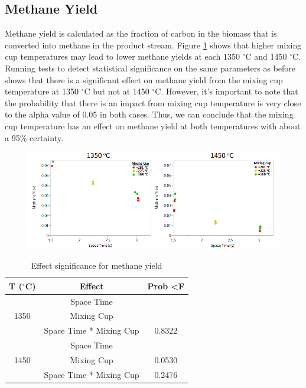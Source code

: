 \documentclass[11pt,twocolumn]{article}
\begin{document}
\subsection*{Methane Yield}

Methane yield is calculated as the fraction of carbon in the biomass that is converted into methane
in the product stream. Figure \ref{plot_ch4} shows that
higher mixing cup temperatures may lead to lower
methane yields at each 1350 $^\circ$C and 1450 $^\circ$C. Running tests to detect statistical significance on the
same parameters as before shows that there is a
significant effect on methane yield from the mixing cup temperature at 1350 $^\circ$C but not at 1450
$^\circ$C.  However, it's important to note that the probability that there is an impact from mixing cup
temperature is very close to the alpha value of
0.05 in both cases. Thus, we can conclude that the
mixing cup temperature has an effect on methane
yield at both temperatures with about a 95\% certainty.

\begin{figure}
\centering
\includegraphics[width = \textwidth]{ch4_yield.png}
\caption{}
\label{plot_ch4}
\end{figure}

\begin{table}
	\centering
	\caption{Effect significance for methane yield}
	\label{tbl_ch4}
	\begin{tabular}{|c|c|c|}
	\hline
	T ($^\circ$C)			&	Effect				&	Prob \textless F	\\
	\hline
	\multirow{3}{*}{1350}	&	Space Time			&	\color{red}{\textless 0.0001} \\
	{}					&	Mixing Cup			&	\color{red}{0.0495} \\
	{}					&	Space Time * Mixing Cup	&	0.8322 \\
	\hline
	\multirow{3}{*}{1450}	&	Space Time			&	\color{red}{\textless 0.0001} \\
	{}					&	Mixing Cup			&	0.0530 \\
	{}					&	Space Time * Mixing Cup	&	0.2476 \\	
	\hline
	\end{tabular}
\end{table}
\end{document}
